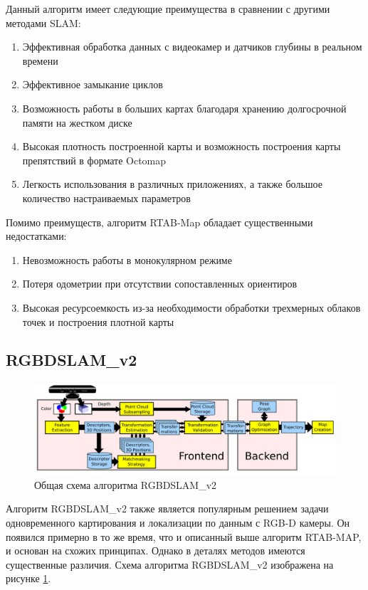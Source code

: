 \documentclass{mipt-thesis-ms}
\begin{document}
	Данный алгоритм имеет следующие преимущества в сравнении с другими методами SLAM:
	\begin{enumerate}
		\item {Эффективная обработка данных с видеокамер и датчиков глубины в реальном времени}
		\item {Эффективное замыкание циклов}
		\item {Возможность работы в больших картах благодаря хранению долгосрочной памяти на жестком диске}
		\item {Высокая плотность построенной карты и возможность построения карты препятствий в формате Octomap}
		\item {Легкость использования в различных приложениях, а также большое количество настраиваемых параметров}
	\end{enumerate}
	Помимо преимуществ, алгоритм RTAB-Map обладает существенными недостатками:
	\begin{enumerate}
		\item {Невозможность работы в монокулярном режиме}
		\item {Потеря одометрии при отсутствии сопоставленных ориентиров}
		\item {Высокая ресурсоемкость из-за необходимости обработки трехмерных облаков точек и построения плотной карты}
	\end{enumerate}
	
	\subsection{RGBDSLAM\_v2}
	
	\begin{figure}
		\includegraphics[width=1.0\textwidth]{img/rgbdslam_scheme.png}
		\caption{Общая схема алгоритма RGBDSLAM\_v2}
		\label{figure_rgbdslam}
	\end{figure}
	
	Алгоритм RGBDSLAM\_v2 \cite{endres20133} также является популярным решением задачи одновременного картирования и локализации по данным с RGB-D камеры. Он появился примерно в то же время, что и описанный выше алгоритм RTAB-MAP, и основан на схожих принципах. Однако в деталях методов имеются существенные различия. Схема алгоритма RGBDSLAM\_v2 изображена на рисунке \ref{figure_rgbdslam}.
	
\end{document}
